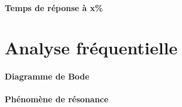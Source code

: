 \paragraph{Temps de réponse à x\%}
\begin{figure}[!hbt]
    \centering
    
\end{figure}
\clearpage

{\tikzset{external/export=false}

}
\section{Analyse fréquentielle}
\paragraph{Diagramme de Bode}
\begin{figure}[!h]
    \centering
    
\end{figure}
\paragraph{Phénomène de résonance}
\begin{figure}[!hb]
    \centering
    
\end{figure}

